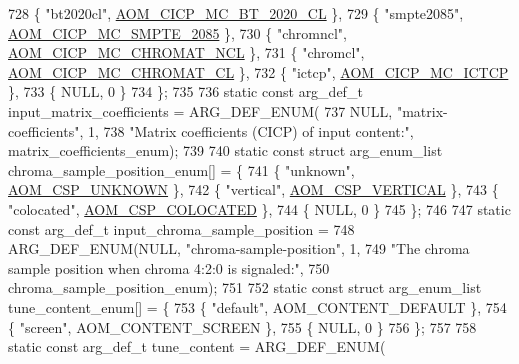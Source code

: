 \begin{DoxyCodeInclude}
{{{{{{{728   \{ \textcolor{stringliteral}{"bt2020cl"}, \hyperlink{aom__image_8h_a6bc018ed9689367acae810bc58527081a34148eae7b467eece6af5c90405dde6b}{AOM\_CICP\_MC\_BT\_2020\_CL} \},
729   \{ \textcolor{stringliteral}{"smpte2085"}, \hyperlink{aom__image_8h_a6bc018ed9689367acae810bc58527081a3aeb0ed0afc0a92ce758f109cd05ee80}{AOM\_CICP\_MC\_SMPTE\_2085} \},
730   \{ \textcolor{stringliteral}{"chromncl"}, \hyperlink{aom__image_8h_a6bc018ed9689367acae810bc58527081a30661e9d9b70ffe9f51f3bdbfd02865b}{AOM\_CICP\_MC\_CHROMAT\_NCL} \},
731   \{ \textcolor{stringliteral}{"chromcl"}, \hyperlink{aom__image_8h_a6bc018ed9689367acae810bc58527081aa391f9255e4775da0120f7472b417193}{AOM\_CICP\_MC\_CHROMAT\_CL} \},
732   \{ \textcolor{stringliteral}{"ictcp"}, \hyperlink{aom__image_8h_a6bc018ed9689367acae810bc58527081a7695b0577d3884a89c578f28f4237aee}{AOM\_CICP\_MC\_ICTCP} \},
733   \{ NULL, 0 \}
734 \};
735 
736 \textcolor{keyword}{static} \textcolor{keyword}{const} arg\_def\_t input\_matrix\_coefficients = ARG\_DEF\_ENUM(
737     NULL, \textcolor{stringliteral}{"matrix-coefficients"}, 1,
738     \textcolor{stringliteral}{"Matrix coefficients (CICP) of input content:"}, matrix\_coefficients\_enum);
739 
740 \textcolor{keyword}{static} \textcolor{keyword}{const} \textcolor{keyword}{struct }arg\_enum\_list chroma\_sample\_position\_enum[] = \{
741   \{ \textcolor{stringliteral}{"unknown"}, \hyperlink{aom__image_8h_a10590253ef3dbde7e93ed5d4b4e0e73ba7843506f3e28f720be0d4f03237fb48c}{AOM\_CSP\_UNKNOWN} \},
742   \{ \textcolor{stringliteral}{"vertical"}, \hyperlink{aom__image_8h_a10590253ef3dbde7e93ed5d4b4e0e73baf95ced9b8288642205301cc51e0b55c6}{AOM\_CSP\_VERTICAL} \},
743   \{ \textcolor{stringliteral}{"colocated"}, \hyperlink{aom__image_8h_a10590253ef3dbde7e93ed5d4b4e0e73ba01ef7204c2234ef43acfd493d5e18c84}{AOM\_CSP\_COLOCATED} \},
744   \{ NULL, 0 \}
745 \};
746 
747 \textcolor{keyword}{static} \textcolor{keyword}{const} arg\_def\_t input\_chroma\_sample\_position =
748     ARG\_DEF\_ENUM(NULL, \textcolor{stringliteral}{"chroma-sample-position"}, 1,
749                  \textcolor{stringliteral}{"The chroma sample position when chroma 4:2:0 is signaled:"},
750                  chroma\_sample\_position\_enum);
751 
752 \textcolor{keyword}{static} \textcolor{keyword}{const} \textcolor{keyword}{struct }arg\_enum\_list tune\_content\_enum[] = \{
753   \{ \textcolor{stringliteral}{"default"}, AOM\_CONTENT\_DEFAULT \},
754   \{ \textcolor{stringliteral}{"screen"}, AOM\_CONTENT\_SCREEN \},
755   \{ NULL, 0 \}
756 \};
757 
758 \textcolor{keyword}{static} \textcolor{keyword}{const} arg\_def\_t tune\_content = ARG\_DEF\_ENUM(
}}}}}}}
\end{DoxyCodeInclude}
